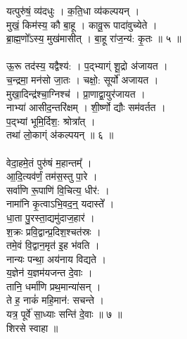 यत्पुरु॑षं॒ व्य॑दधुः । क॒ति॒धा व्य॑कल्पयन् ।\\
मुखं॒ किम॑स्य॒ कौ बा॒हू । कावू॒रू पादा॑वुच्येते ।\\
ब्रा॒ह्म॒णो᳚ऽस्य॒ मुख॑मासीत् । बा॒हू रा॑ज॒न्य॑: कृ॒तः ॥ ५ ॥\\
\\
ऊ॒रू तद॑स्य॒ यद्वैश्य॑: । प॒द्भ्याग्ं शू॒द्रो अ॑जायत ।\\
च॒न्द्रमा॒ मन॑सो जा॒तः । चक्षो॒: सूर्यो॑ अजायत ।\\
मुखा॒दिन्द्र॑श्चा॒ग्निश्च॑ । प्रा॒णाद्वा॒युर॑जायत ।\\
नाभ्या॑ आसीद॒न्तरि॑क्षम् । शी॒र्ष्णो द्यौः सम॑वर्तत ।\\
प॒द्भ्यां भूमि॒र्दिश॒: श्रोत्रा᳚त् ।\\
तथा॑ लो॒काग्ं अ॑कल्पयन् ॥ ६ ॥\\
\\
वेदा॒हमे॒तं पुरु॑षं म॒हान्तम्᳚ ।\\
आ॒दि॒त्यव॑र्णं॒ तम॑स॒स्तु पा॒रे ।\\
सर्वा॑णि रू॒पाणि॑ वि॒चित्य॒ धीर॑: ।\\
नामा॑नि कृ॒त्वाऽभि॒वद॒न्॒ यदास्ते᳚ ।\\
धा॒ता पु॒रस्ता॒द्यमु॑दाज॒हार॑ ।\\
श॒क्रः प्रवि॒द्वान्प्र॒दिश॒श्चत॑स्रः ।\\
तमे॒वं वि॒द्वान॒मृत॑ इ॒ह भ॑वति ।\\
नान्यः पन्था॒ अय॑नाय विद्यते ।\\
य॒ज्ञेन॑ य॒ज्ञम॑यजन्त दे॒वाः ।\\
तानि॒ धर्मा॑णि प्रथ॒मान्या॑सन् ।\\
ते ह॒ नाकं॑ महि॒मान॑: सचन्ते ।\\
यत्र॒ पूर्वे॑ सा॒ध्याः सन्ति॑ दे॒वाः ॥ ७ ॥\\
शिरसे स्वाहा ॥\\

